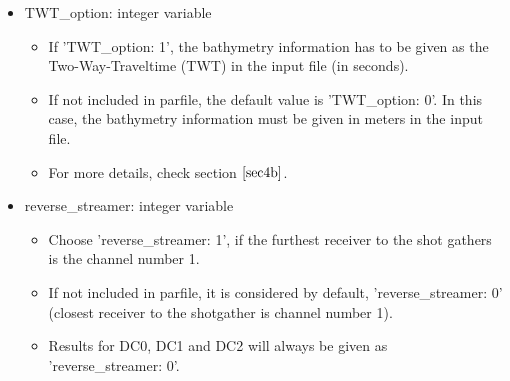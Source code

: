 \documentclass[11pt, oneside]{article}   	%
\begin{document}
\begin{itemize}
\begin{itemize}
	\end{itemize}
	
\item  TWT\_option: integer variable 
	\begin{itemize}
	\item If 'TWT\_option: 1', the bathymetry information has to be given as the Two-Way-Traveltime (TWT) in the input file (in seconds).
	\item If not included in parfile, the default value is 'TWT\_option: 0'. In this case, the bathymetry information must be given in meters in the input file.
	\item For more details, check section $\ref{sec4b}$.

	\end{itemize}
  
\item reverse\_streamer: integer variable 
	\begin{itemize}
	\item Choose 'reverse\_streamer: 1', if the furthest receiver to the shot gathers is the channel number 1.
	\item If not included in parfile, it is considered by default, 'reverse\_streamer: 0' (closest receiver to the shotgather is channel number 1). 
	\item Results for DC0, DC1 and DC2 will always be given as 'reverse\_streamer: 0'.
	\end{itemize}
  


\end{itemize}
\end{document}
